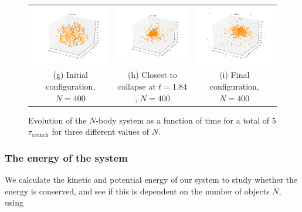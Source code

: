 \documentclass{article}
\begin{document}
\begin{multicols}{2}
\begin{figure}
\begin{center}
\begin{tabular}{ccc}
	\includegraphics[width=60mm]{Images/Image_400_0000.png}
	& \includegraphics[width=60mm]{Images/Image_400_1835.png}
	& \includegraphics[width=60mm]{Images/Image_400_4995.png} \\
	(g) Initial configuration, $N = 400$					& (h) Closest to collapse at $t = 1.84$, $N = 400$	 	& (i) Final configuration, $N = 400$	 \\[6pt]
\end{tabular}
\caption{Evolution of the $N$-body system as a function of time for a total of 5$\tau_{\mathrm{crunch}}$ for three different values of $N$.}\label{fig:N_body_simulation}
\end{center}
\end{figure}




\subsubsection{The energy of the system}

We calculate the kinetic and potential energy of our system to study whether the energy is conserved, and see if this is dependent on the number of objects $N$, using


\end{multicols}
\end{document}
